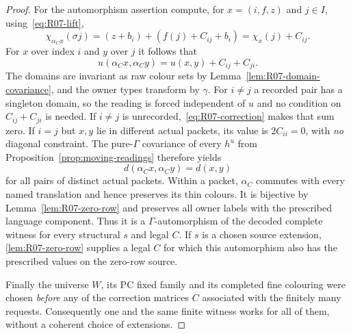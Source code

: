 \begin{proof}
For the automorphism assertion compute, for
$x=(i,f,z)$ and $j\in I$, using~\eqref{eq:R07-lift},
\[
 \chi_{\alpha_C x}(\sigma j)
 =(z+b_i)+(f(j)+C_{ij}+b_i)
 =\chi_x(j)+C_{ij}.
\]
For $x$ over index $i$ and $y$ over $j$ it follows that
\begin{equation}\label{eq:R07-row-covariance}
 u(\alpha_Cx,\alpha_Cy)=u(x,y)+C_{ij}+C_{ji}.
\end{equation}
The domains are invariant as raw colour sets by
Lemma~\ref{lem:R07-domain-covariance}, and the owner types
transform by $\gamma$.  For $i\ne j$ a recorded pair has a
singleton domain, so the reading is forced independent of
$u$ and no condition on $C_{ij}+C_{ji}$ is needed.  If
$i\ne j$ is unrecorded,~\eqref{eq:R07-correction} makes
that sum zero.  If $i=j$ but $x,y$ lie in different actual
packets, its value is $2C_{ii}=0$, with \emph{no} diagonal
constraint.  The pure-$\Gamma$ covariance of every $h^u$
from Proposition~\ref{prop:moving-readings} therefore yields
\[
 d(\alpha_Cx,\alpha_Cy)=d(x,y)
\]
for all pairs of distinct actual packets.  Within a packet,
$\alpha_C$ commutes with every named translation and hence
preserves its thin colours.  It is bijective by
Lemma~\ref{lem:R07-zero-row} and preserves all owner labels
with the prescribed language component.  Thus it is a $\Gamma$-automorphism of the decoded complete witness
for every structural $s$ and legal $C$. If $s$ is a chosen source
extension, \cref{lem:R07-zero-row} supplies a legal $C$ for which
this automorphism also has the prescribed values on the zero-row
source.

Finally the universe $W$, its PC fixed family and its
completed fine colouring were chosen \emph{before} any of
the correction matrices $C$ associated with the finitely
many requests.  Consequently one and the same finite witness
works for all of them, without a coherent choice of
extensions.
\end{proof}

